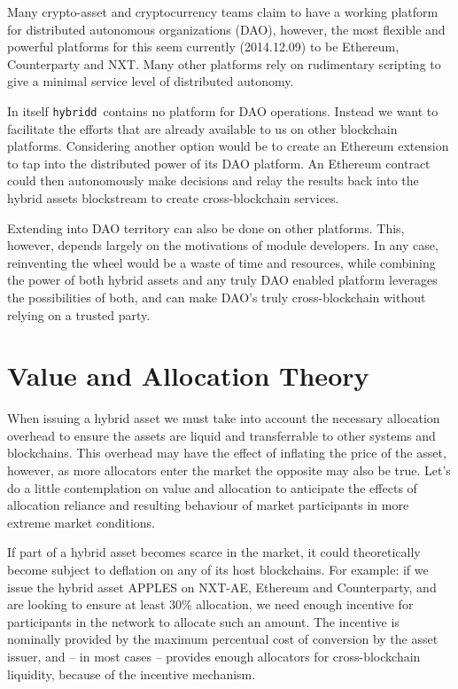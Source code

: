 \documentclass[11pt, a4paper]{article}
\newcommand{\hybridd}{\texttt{hybridd}\, }
\begin{document}
Many crypto-asset and cryptocurrency teams claim to have a working platform for distributed autonomous organizations (DAO), however, the most flexible and powerful platforms for this seem currently (2014.12.09) to be Ethereum, Counterparty and NXT. Many other platforms rely on rudimentary scripting to give a minimal service level of distributed autonomy.

In itself \hybridd contains no platform for DAO operations. Instead we want to facilitate the efforts that are already available to us on other blockchain platforms. Considering another option would be to create an Ethereum extension to tap into the distributed power of its DAO platform. An Ethereum contract could then autonomously make decisions and relay the results back into the hybrid assets blockstream to create cross-blockchain services.

Extending into DAO territory can also be done on other platforms. This, however, depends largely on the motivations of module developers. In any case, reinventing the wheel would be a waste of time and resources, while combining the power of both hybrid assets and any truly DAO enabled platform leverages the possibilities of both, and can make DAO's truly cross-blockchain without relying on a trusted party.


\section{Value and Allocation Theory}

When issuing a hybrid asset we must take into account the necessary allocation overhead to ensure the assets are liquid and transferrable to other systems and blockchains. This overhead may have the effect of inflating the price of the asset, however, as more allocators enter the market the opposite may also be true. Let's do a little contemplation on value and allocation to anticipate the effects of allocation reliance and resulting behaviour of market participants in more extreme market conditions.

If part of a hybrid asset becomes scarce in the market, it could
theoretically become subject to deflation on any of its host
blockchains. For example: if we issue the hybrid asset APPLES on NXT-AE,
Ethereum and Counterparty\cite{counterparty}, and are looking to ensure
at least $30\%$ allocation, we need enough incentive for participants in
the network to allocate such an amount. The incentive is nominally
provided by the maximum percentual cost of conversion by the asset
issuer, and -- in most cases -- provides enough allocators for
cross-blockchain liquidity, because of the incentive mechanism.
\end{document}
